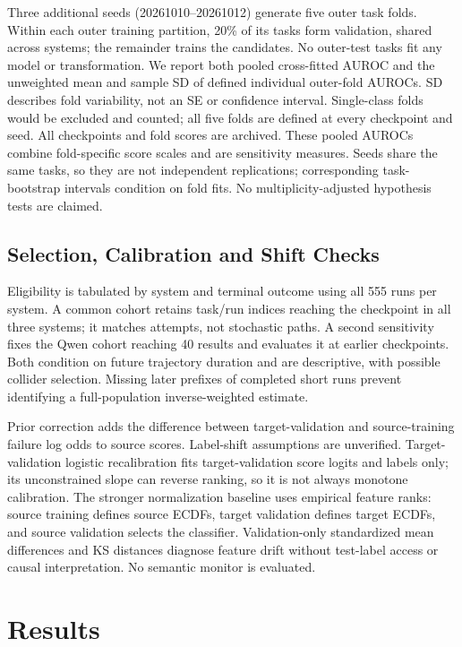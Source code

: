\documentclass[conference]{IEEEtran}
\begin{document}
Three additional seeds (20261010--20261012) generate five outer task folds. Within each outer training partition, 20\% of its tasks form validation, shared across systems; the remainder trains the candidates. No outer-test tasks fit any model or transformation. We report both pooled cross-fitted AUROC and the unweighted mean and sample SD of defined individual outer-fold AUROCs. SD describes fold variability, not an SE or confidence interval. Single-class folds would be excluded and counted; all five folds are defined at every checkpoint and seed. All checkpoints and fold scores are archived. These pooled AUROCs combine fold-specific score scales and are sensitivity measures. Seeds share the same tasks, so they are not independent replications; corresponding task-bootstrap intervals condition on fold fits. No multiplicity-adjusted hypothesis tests are claimed.

\subsection{Selection, Calibration and Shift Checks}
Eligibility is tabulated by system and terminal outcome using all 555 runs per system. A common cohort retains task/run indices reaching the checkpoint in all three systems; it matches attempts, not stochastic paths. A second sensitivity fixes the Qwen cohort reaching 40 results and evaluates it at earlier checkpoints. Both condition on future trajectory duration and are descriptive, with possible collider selection. Missing later prefixes of completed short runs prevent identifying a full-population inverse-weighted estimate.

Prior correction adds the difference between target-validation and source-training failure log odds to source scores. Label-shift assumptions are unverified. Target-validation logistic recalibration fits target-validation score logits and labels only; its unconstrained slope can reverse ranking, so it is not always monotone calibration. The stronger normalization baseline uses empirical feature ranks: source training defines source ECDFs, target validation defines target ECDFs, and source validation selects the classifier. Validation-only standardized mean differences and KS distances diagnose feature drift without test-label access or causal interpretation. No semantic monitor is evaluated.

\section{Results}
\end{document}
